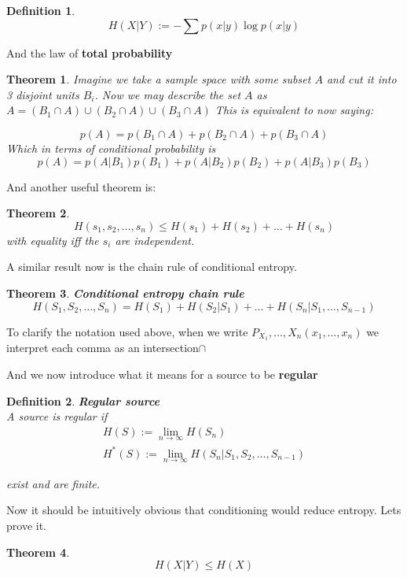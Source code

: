 \documentclass[titlepage]{article}
\newtheorem{theorem}{Theorem}[section]
\newtheorem{definition}{Definition}
\begin{document}
\begin{definition}
$$H(X|Y) := - \sum p(x|y)\log p(x|y)$$
\end{definition}

And the law of \textbf{total probability}

\begin{theorem}
Imagine we take a sample space with some subset $A$ and cut it into 3 disjoint units $B_{i}$. Now we may describe the set $A$ as $A = (B_{1} \cap A) \cup (B_{2} \cap A) \cup (B_{3} \cap A)$ This is equivalent to now saying:

$$p(A) = p(B_{1} \cap A) + p(B_{2} \cap A) + p(B_{3} \cap A) $$
Which in terms of conditional probability is $$p(A) = p(A|B_{1})p(B_{1}) + p(A|B_{2})p(B_{2}) + p(A|B_{3})p(B_{3})$$
\end{theorem}

And another useful theorem is:

\begin{theorem}
$$H(s_{1},s_{2},\ldots,s_{n}) \leq H(s_{1}) + H(s_{2}) + \ldots + H(s_{n})$$
with equality iff the $s_{i}$ are independent. 
\end{theorem}

A similar result now is the chain rule of conditional entropy.
\begin{theorem}\textbf{Conditional entropy chain rule}
$$H(S_{1},S_{2},\ldots,S_{n}) = H(S_{1}) + H(S_{2}|S_{1}) + \ldots + H(S_{n}|S_{1},\ldots,S_{n-1})$$
\end{theorem}

To clarify the notation used above, when we write $P_{X_{1}}, \ldots, X_{n}(x_{1},\ldots, x_{n})$ we interpret each comma as an intersection$\cap$

And we now introduce what it means for a source to be \textbf{regular}

\begin{definition}\textbf{Regular source}
\\
A source is regular if
\begin{align*}
    H(S) := \lim_{n\to\infty} H(S_{n})\\
    H^{*}(S) := \lim_{n \to \infty} H(S_{n}|S_{1},S_{2},\ldots,S_{n-1})
\end{align*}

exist and are finite. 
\end{definition}

Now it should be intuitively obvious that conditioning would reduce entropy. Lets prove it.

\begin{theorem}
$$H(X|Y) \leq H(X)$$
\end{theorem}
\end{document}
